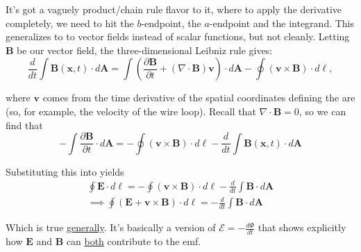 \documentclass{article}
\newcommand*\circled[1]{\tikz[baseline=(char.base)]{
            \node[shape=circle,draw,inner sep=2pt] (char) {#1};}}
\numberwithin{equation}{section}
\begin{document}
It's got a vaguely product/chain rule flavor to it, where to apply the derivative completely, we need to hit the $b$-endpoint, the $a$-endpoint and the integrand. This generalizes to to vector fields instead of scalar functions, but not cleanly. Letting $\bm{B}$ be our vector field, the three-dimensional Leibniz rule gives:
\begin{equation*}
    \frac{d}{dt} \int \bm{B}(\bm{x}, t) \cdot d\bm{A} = \int \left( \frac{\partial \bm{B}}{\partial t} + \left( \nabla \cdot \bm{B} \right) \bm{v} \right) \cdot d\bm{A} - \oint \left( \bm{v} \times \bm{B} \right) \cdot d\bm{\ell},
\end{equation*}

where $\bm{v}$ comes from the time derivative of the spatial coordinates defining the are (so, for example, the velocity of the wire loop). Recall that $\nabla \cdot \bm{B} = 0$, so we can find that
\begin{equation*}
    -\int \frac{\partial \bm{B}}{\partial t} \cdot d\bm{A} = -\oint \left( \bm{v} \times \bm{B} \right) \cdot d\bm{\ell} - \frac{d}{dt} \int \bm{B}(\bm{x}, t) \cdot d\bm{A}
\end{equation*}

Substituting this into \circled{2} yields
\begin{gather*}
    \oint \bm{E} \cdot d\bm{\ell} = -\oint \left( \bm{v} \times \bm{B} \right) \cdot d\bm{\ell} - \frac{d}{dt} \int \bm{B} \cdot d\bm{A} \\
    \implies \boxed{\oint \left( \bm{E} + \bm{v} \times \bm{B} \right) \cdot d\bm{\ell} = -\frac{d}{dt} \int \bm{B} \cdot d\bm{A}}
\end{gather*}

Which is true \underline{generally}. It's basically a version of $\displaystyle \mathcal{E} = -\frac{d\Phi}{dt}$ that shows explicitly how $\bm{E}$ and $\bm{B}$ can \underline{both} contribute to the emf.
\end{document}
